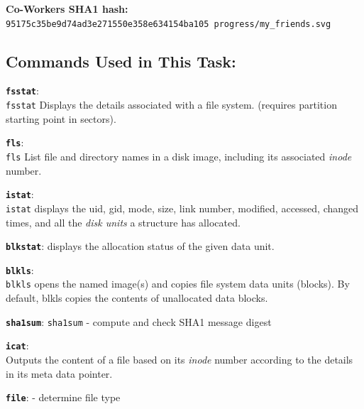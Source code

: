 \documentclass[a4paper,11pt]{article}
\begin{document}
{\noindent
\textbf{Co-Workers SHA1 hash:}\\
\texttt{95175c35be9d74ad3e271550e358e634154ba105  progress/my\_friends.svg}
}
\subsection*{Commands Used in This Task:}
\begin{itemize*}
	\item \textbf{\texttt{fsstat}}:\\ \texttt{fsstat} Displays the details associated with a file system. (requires partition starting point in sectors).
	\item \textbf{\texttt{fls}}:\\ \texttt{fls} List file and directory names in a disk image, including its associated \textit{inode} number.
	\item \textbf{\texttt{istat}}:\\ \texttt{istat}  displays the uid, gid, mode, size, link number, modified, accessed, changed times, and all the \textit{disk units} a structure has allocated.
	\item \textbf{\texttt{blkstat}}: displays the allocation status of the given data unit. 
	\item \textbf{\texttt{blkls}}:\\ \texttt{blkls} opens  the named image(s) and copies file system data units (blocks).  By default, blkls copies the contents of unallocated data blocks.
	\item \textbf{\texttt{sha1sum}}: \texttt{sha1sum}	- compute and check SHA1 message digest
	
	\item \textbf{\texttt{icat}}: \\  Outputs the content of a file based on its \textit{inode} number according to the details in its meta data pointer.
	
	\item \textbf{\texttt{file}}:  - determine file type
\end{itemize*}
\end{document}
